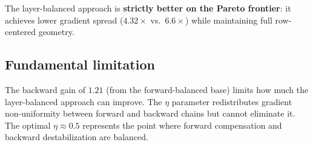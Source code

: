 The layer-balanced approach is \textbf{strictly better on the Pareto
frontier}: it achieves lower gradient spread ($4.32\times$ vs.\
$6.6\times$) while maintaining full row-centered geometry.

\subsection{Fundamental limitation}

The backward gain of $1.21$ (from the forward-balanced base) limits
how much the layer-balanced approach can improve.
The $\eta$ parameter redistributes gradient non-uniformity between
forward and backward chains but cannot eliminate it.
The optimal $\eta \approx 0.5$ represents the point where forward
compensation and backward destabilization are balanced.
